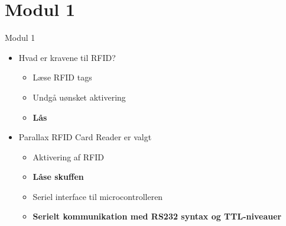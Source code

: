 \documentclass{beamer}
\begin{document}

\section{Modul 1}
\begin{frame}{Modul 1}
\begin{itemize}
\item Hvad er kravene til RFID?
\begin{itemize}
\item Læse RFID tags
\item Undgå uønsket aktivering
\item \textbf{Lås}
\end{itemize}

\item Parallax RFID Card Reader er valgt
\begin{itemize}
\item Aktivering af RFID
\item \textbf{Låse skuffen}
\item Seriel interface til microcontrolleren
\item \textbf{Serielt kommunikation med RS232 syntax og TTL-niveauer}
\end{itemize}

\end{itemize}
\end{frame}

\end{document}
